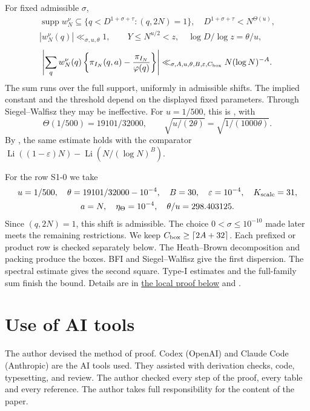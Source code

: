 \documentclass{amsart}
\numberwithin{equation}{section}
\numberwithin{table}{section}
\theoremstyle{definition}
\begin{document}
For fixed admissible $\sigma$,
\[
 \begin{gathered}
 \operatorname{supp}w_N^\nu\subseteq
 \{q<D^{1+\sigma+\tau}:(q,2N)=1\},\quad
 D^{1+\sigma+\tau}<N^{\Theta(u)},\\
 |w_N^\nu(q)|\ll_{\sigma,u,\theta}1,\qquad
 Y\le N^{u/2}<z,\quad \log D/\log z=\theta/u,
 \end{gathered}
\]
\[
 \left|\sum_q w_N^\nu(q)
 \left\{\pi_{I_N}(q,a)-\frac{\pi_{I_N}}{\varphi(q)}\right\}\right|
 \ll_{\sigma,A,u,\theta,B,\varepsilon,C_{\rm box}} N(\log N)^{-A}.
\]
The sum runs over the full support, uniformly in admissible shifts.
The implied constant and the threshold depend on the displayed fixed parameters.
Through Siegel--Walfisz they may be ineffective.
For $u=1/500$, this is \cite[Theorem~1.1]{Z1}, with
\[
 \Theta(1/500)=19101/32000,\qquad
 \sqrt{u/(2\theta)}=\sqrt{1/(1000\theta)}.
\]
By \cite[Corollary~1.3]{Z1}, the same estimate holds with the comparator
$\operatorname{Li}((1-\varepsilon)N)-\operatorname{Li}(N/(\log N)^B)$.

For the row S1-0 we take
\[
 \begin{gathered}
 u=1/500,\quad\theta=19101/32000-10^{-4},\quad
 B=30,\quad\varepsilon=10^{-4},\quad K_{\rm scale}=31,\\
 a=N,\quad\eta_\Theta=10^{-4},\quad \theta/u=298.403125.
 \end{gathered}
\]
Since $(q,2N)=1$, this shift is admissible.
The choice $0<\sigma\le10^{-10}$ made later meets the remaining restrictions.
We keep $C_{\rm box}\ge\lceil2A+32\rceil$.
Each prefixed or product row is checked separately below.
The Heath--Brown decomposition \cite{ref6} and packing produce the boxes.
BFI and Siegel--Walfisz give the first dispersion.
The spectral estimate gives the second square.
Type-I estimates and the full-family sum finish the bound.
Details are in \hyperref[p2:dispersion-proof]{the local proof below} and
\cite[\S\S3--5 and Appendix~B]{Z1}.


\setcounter{equation}{30}






\appendix



\section*{Use of AI tools}
The author devised the method of proof.
Codex (OpenAI) and Claude Code (Anthropic) are the AI tools used.
They assisted with derivation checks, code, typesetting, and review.
The author checked every step of the proof, every table and every reference.
The author takes full responsibility for the content of the paper.
\end{document}
